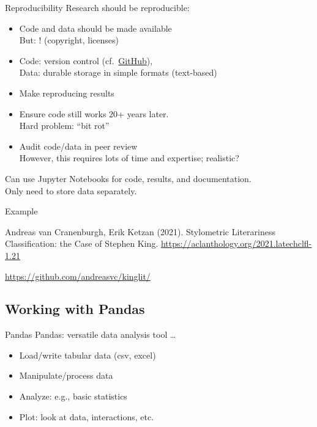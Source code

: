 \documentclass[aspectratio=169,usenames,dvipsnames]{beamer}
\begin{document}
\begin{frame}{Reproducibility}
    Research should be reproducible:

    \begin{itemize}
        \item Code and data should be made available \\
            But: ! (copyright, licenses)
        \item Code: version control (cf.\ \href{http://www.github.com}{GitHub}),\\
            Data: durable storage in simple formats (text-based)
        \item Make reproducing results 
        \item Ensure code still works 20+ years later. \\
            Hard problem: ``bit rot''
        \item Audit code/data in peer review \\
            However, this requires lots of time and expertise; realistic?
    \end{itemize}

    Can use Jupyter Notebooks for code, results, and documentation. \\
    Only need to store data separately.
\end{frame}

\begin{frame}{Example}
    \begin{reference}
    Andreas van Cranenburgh, Erik Ketzan (2021).
    Stylometric Literariness Classification: the Case of Stephen King.
    \url{https://aclanthology.org/2021.latechclfl-1.21}
    \end{reference}
    \url{https://github.com/andreasvc/kinglit/}

\end{frame}

\subsection{Working with Pandas}
\frame{\tableofcontents[currentsubsection]}

\begin{frame}{Pandas}
    Pandas: versatile data analysis tool \dots

    \begin{itemize}
        \item Load/write tabular data (csv, excel)
        \item Manipulate/process data
        \item Analyze: e.g., basic statistics
        \item Plot: look at data, interactions, etc.
    \end{itemize}
\end{frame}
\end{document}
